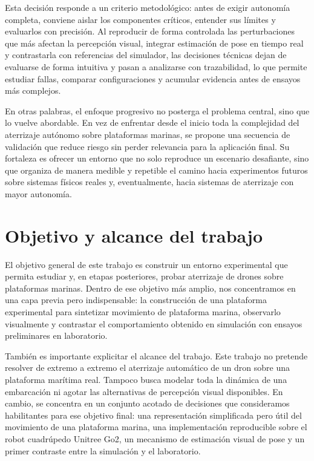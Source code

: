 \documentclass[12pt,a4paper]{report}
\begin{document}
Esta decisión responde a un criterio metodológico: antes de exigir autonomía
completa, conviene aislar los componentes críticos, entender sus límites y
evaluarlos con precisión. Al reproducir de forma controlada las perturbaciones
que más afectan la percepción visual, integrar estimación de pose en tiempo real
y contrastarla con referencias del simulador, las decisiones técnicas dejan de
evaluarse de forma intuitiva y pasan a analizarse con trazabilidad, lo que
permite estudiar fallas, comparar configuraciones y acumular evidencia antes de
ensayos más complejos.

En otras palabras, el enfoque progresivo no posterga el problema central, sino
que lo vuelve abordable. En vez de enfrentar desde el inicio toda la
complejidad del aterrizaje autónomo sobre plataformas marinas, se
propone una secuencia de validación que reduce riesgo sin perder relevancia para
la aplicación final. Su fortaleza es ofrecer un entorno que no solo reproduce
un escenario desafiante, sino que organiza de manera medible y repetible el
camino hacia experimentos futuros sobre sistemas físicos reales y,
eventualmente, hacia sistemas de aterrizaje con mayor autonomía.

\section{Objetivo y alcance del trabajo}

El objetivo general de este trabajo es construir un entorno experimental que permita
estudiar y, en etapas posteriores, probar aterrizaje de drones sobre
plataformas marinas. Dentro de ese objetivo más amplio, nos concentramos en una
capa previa pero indispensable: la construcción de una plataforma experimental
para sintetizar movimiento de plataforma marina, observarlo visualmente y
contrastar el comportamiento obtenido en simulación con ensayos preliminares en
laboratorio.

También es importante explicitar el alcance del trabajo. Este trabajo no pretende
resolver de extremo a extremo el aterrizaje automático de un dron sobre una
plataforma marítima real. Tampoco busca modelar toda la dinámica de una
embarcación ni agotar las alternativas de percepción visual disponibles. En
cambio, se concentra en un conjunto acotado de decisiones que consideramos
habilitantes para ese objetivo final: una representación simplificada pero útil
del movimiento de una plataforma marina, una implementación reproducible sobre
el robot cuadrúpedo Unitree Go2, un mecanismo de estimación visual de pose y un
primer contraste entre la simulación y el laboratorio.
\end{document}
